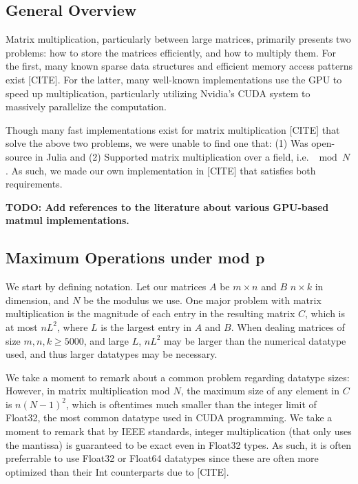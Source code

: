 



\subsection{General Overview}

Matrix multiplication, particularly between large matrices, primarily presents two problems: how to store the matrices efficiently, and how to multiply them. For the first, many known sparse data structures and efficient memory access patterns exist [CITE]. For the latter, many well-known implementations use the GPU to speed up multiplication, particularly utilizing Nvidia's CUDA system to massively parallelize the computation.

Though many fast implementations exist for matrix multiplication [CITE] that solve the above two problems, we were unable to find one that: (1) Was open-source in Julia and (2) Supported matrix multiplication over a field, i.e. $\mod N$. As such, we made our own implementation in [CITE] that satisfies both requirements.

\textbf{TODO: Add references to the literature about various GPU-based matmul implementations.}

\subsection{Maximum Operations under mod p}

We start by defining notation. Let our matrices $A$ be $m \times n$ and $B$ $n \times k$ in dimension, and $N$ be the modulus we use. One major problem with matrix multiplication is the magnitude of each entry in the resulting matrix $C$, which is at most $n L^2$, where $L$ is the largest entry in $A$ and $B$. When dealing matrices of size $m,n,k \geq 5000$, and large $L$, $n L^2$ may be larger than the numerical datatype used, and thus larger datatypes may be necessary.

We take a moment to remark about a common problem regarding datatype sizes: However, in matrix multiplication mod $N$, the maximum size of any element in $C$ is $n (N-1)^2$, which is oftentimes much smaller than the integer limit of Float32, the most common datatype used in CUDA programming. We take a moment to remark that by IEEE standards, integer multiplication (that only uses the mantissa) is guaranteed to be exact even in Float32 types. As such, it is often preferrable to use Float32 or Float64 datatypes since these are often more optimized than their Int counterparts due to [CITE].

